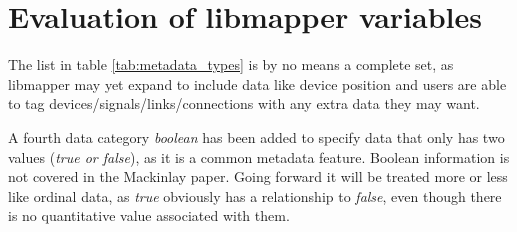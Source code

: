 

\section{Evaluation of libmapper variables} %
\label{sec:evaluation_of_libmapper_variables}

The list in table \ref{tab:metadata_types} is by no means a complete set, as libmapper may yet expand to include data like device position and users are able to tag devices/signals/links/connections with any extra data they may want.

A fourth data category \emph{boolean} has been added to specify data that only has two values (\emph{true or false}), as it is a common metadata feature. Boolean information is not covered in the Mackinlay paper. Going forward it will be treated more or less like ordinal data, as \emph{true} obviously has a relationship to \emph{false}, even though there is no quantitative value associated with them.

